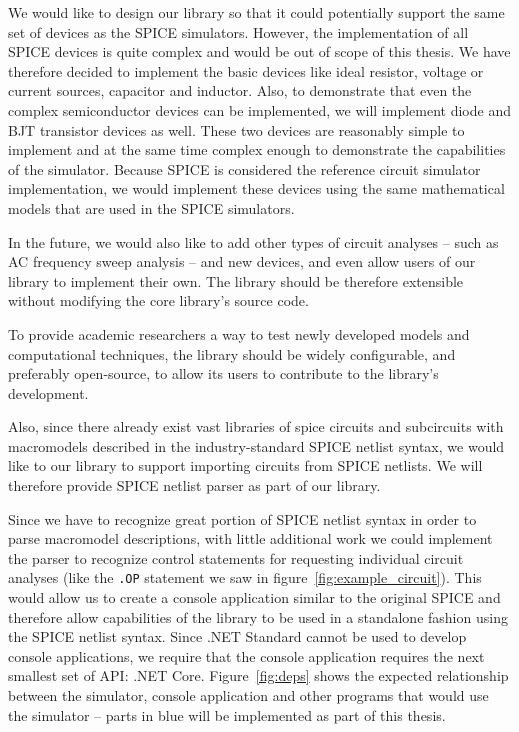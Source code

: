 We would like to design our library so that it could potentially support the same set of devices as the SPICE simulators. However, the implementation of all SPICE devices is quite complex and would be out of scope of this thesis. We have therefore decided to implement the basic devices like ideal resistor, voltage or current sources, capacitor and inductor. Also, to demonstrate that even the complex semiconductor devices can be implemented, we will implement diode and BJT transistor devices as well. These two devices are reasonably simple to implement and at the same time complex enough to demonstrate the capabilities of the simulator. Because SPICE is considered the reference circuit simulator implementation, we would implement these devices using the same mathematical models that are used in the SPICE simulators.

In the future, we would also like to add other types of circuit analyses -- such as AC frequency sweep analysis -- and new devices, and even allow users of our library to implement their own. The library should be therefore extensible without modifying the core library's source code. 

To provide academic researchers a way to test newly developed models and computational techniques, the library should be widely configurable, and preferably open-source, to allow its users to contribute to the library's development.

Also, since there already exist vast libraries of spice circuits and subcircuits with macromodels described in the industry-standard SPICE netlist syntax, we would like to our library to support importing circuits from SPICE netlists. We will therefore provide SPICE netlist parser as part of our library.

Since we have to recognize great portion of SPICE netlist syntax in order to parse macromodel descriptions, with little additional work we could implement the parser to recognize control statements for requesting individual circuit analyses (like the \texttt{.OP} statement we saw in figure~\ref{fig:example_circuit}). This would allow us to create a console application similar to the original SPICE and therefore allow capabilities of the library to be used in a standalone fashion using the SPICE netlist syntax. Since .NET Standard cannot be used to develop console applications, we require that the console application requires the next smallest set of API: .NET Core. Figure~\ref{fig:deps} shows the expected relationship between the simulator, console application and other programs that would use the simulator -- parts in blue will be implemented as part of this thesis.

